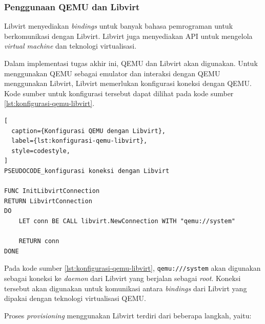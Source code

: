 \subsubsection{Penggunaan QEMU dan Libvirt}
\label{sec:implementasi-libvirt}

Libvirt menyediakan \emph{bindings} untuk banyak bahasa pemrograman
untuk berkomunikasi dengan Libvirt. Libvirt juga menyediakan API untuk
mengelola \emph{virtual machine} dan teknologi virtualisasi.

Dalam implementasi tugas akhir ini, QEMU dan Libvirt akan digunakan.
Untuk menggunakan QEMU sebagai emulator dan interaksi dengan QEMU menggunakan Libvirt,
Libvirt memerlukan konfigurasi koneksi dengan QEMU. Kode sumber untuk konfigurasi
tersebut dapat dilihat pada kode sumber \ref{lst:konfigurasi-qemu-libvirt}.

\begin{lstlisting}[
  caption={Konfigurasi QEMU dengan Libvirt},
  label={lst:konfigurasi-qemu-libvirt},
  style=codestyle,
]
PSEUDOCODE_konfigurasi koneksi dengan Libvirt

FUNC InitLibvirtConnection
RETURN LibvirtConnection
DO
    LET conn BE CALL libvirt.NewConnection WITH "qemu://system"

    RETURN conn
DONE
\end{lstlisting}

Pada kode sumber \ref{lst:konfigurasi-qemu-libvirt}, \lstinline{qemu:///system} akan
digunakan sebagai koneksi ke \emph{daemon} dari Libvirt yang berjalan sebagai \emph{root}.
Koneksi tersebut akan digunakan untuk komunikasi antara \emph{bindings} dari Libvirt yang
dipakai dengan teknologi virtualisasi QEMU.

Proses \emph{provisioning} menggunakan Libvirt terdiri dari beberapa langkah, yaitu:


